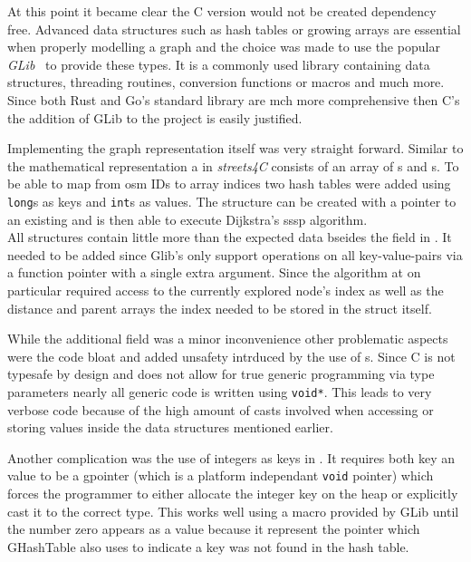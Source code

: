At this point it became clear the C version would not be created dependency free. Advanced data structures such as hash tables or growing arrays are essential when properly modelling a graph and the choice was made to use the popular \textit{GLib}~ to provide these types. It is a commonly used library containing data structures, threading routines, conversion functions or macros and much more. Since both Rust and Go's standard library are mch more comprehensive then C's the addition of GLib to the project is easily justified.

Implementing the graph representation itself was very straight forward. Similar to the mathematical representation a  in \textit{streets4C} consists of an array of s and s. To be able to map from \gls{osm} IDs to array indices two hash tables were added using \lstinline[style=c]{long}s as keys and \lstinline[style=c]{int}s as values. The  structure can be created with a pointer to an existing  and is then able to execute Dijkstra's \acrshort{sssp} algorithm.
\\


All structures contain little more than the expected data bseides the  field in . It needed to be added since Glib's  only support operations on all key-value-pairs via a function pointer with a single extra argument. Since the algorithm at on particular required access to the currently explored node's index as well as the distance and parent arrays the index needed to be stored in the struct itself.

While the additional field was a minor inconvenience other problematic aspects were the code bloat and added unsafety intrduced by the use of s. Since C is not typesafe by design and does not allow for true generic programming via type parameters nearly all generic code is written using \lstinline[style=c]{void*}. This leads to very verbose code because of the high amount of casts involved when accessing or storing values inside the data structures mentioned earlier.

Another complication was the use of integers as keys in . It requires both key an value to be a gpointer (which is a platform independant \lstinline{void} pointer) which forces the programmer to either allocate the integer key on the heap or explicitly cast it to the correct type. This works well using a macro provided by GLib until the number zero appears as a value because it represent the  pointer which GHashTable also uses to indicate a key was not found in the hash table.

